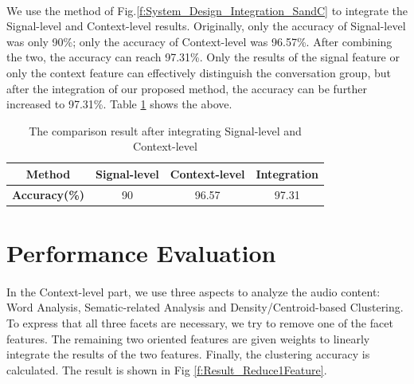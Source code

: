 \documentclass[a4paper,12pt]{report}
\begin{document}
\paragraph{}
We use the method of Fig.\ref{f:System_Design_Integration_SandC} to integrate the Signal-level and Context-level results. Originally, only the accuracy of Signal-level was only 90\%; only the accuracy of Context-level was 96.57\%. After combining the two, the accuracy can reach 97.31\%. Only the results of the signal feature or only the context feature can effectively distinguish the conversation group, but after the integration of our proposed method, the accuracy can be further increased to 97.31\%. 
Table \ref{t:Result_Integration} shows the above.
\\
\begin{table}[btph]
\begin{center}
\caption{The comparison result after integrating Signal-level and Context-level}
\label{t:Result_Integration}
\begin{tabular}{|c|c|c|c|}
\hline
\textbf{Method} & Signal-level     & Context-level  & Integration \\ \hline
\textbf{Accuracy(\%)} & 90 & 96.57 & 97.31 \\ \hline
\end{tabular}

\end{center}
\end{table}

\section{Performance Evaluation}
\paragraph{}
In the Context-level part, we use three aspects to analyze the audio content: Word Analysis, Sematic-related Analysis and Density/Centroid-based Clustering. To express that all three facets are necessary, we try to remove one of the facet features. The remaining two oriented features are given weights to linearly integrate the results of the two features. Finally, the clustering accuracy is calculated. The result is shown in Fig \ref{f:Result_Reduce1Feature}.
\end{document}
